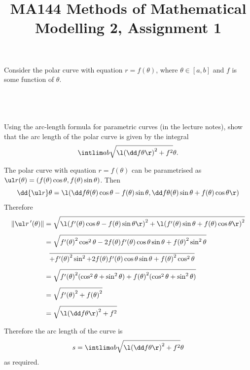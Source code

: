 \documentclass[a4paper]{article}
\title{MA144 Methods of Mathematical Modelling 2, Assignment 1}
\begin{document}
\maketitle

\setlength{\parindent}{0em}
\setlength{\parskip}{1em}


\begin{questionbody}
Consider the polar curve with equation $r = f(\theta)$, where $\theta \in [a, b]$ and $f$ is some function of $\theta$.
\end{questionbody}

\subsection{~} %

\begin{questionbody}
Using the arc-length formula for parametric curves (in the lecture notes), show that the arc length of the polar curve is given by the integral \[
\intlim a b {\sqrt{{\l( \dd f \theta \r)}^2 + f^2}} \theta .
\]
\end{questionbody}

The polar curve with equation $r = f(\theta)$ can be parametrised as $\ul r (\theta) = (f(\theta) \cos \theta, f(\theta) \sin \theta)$. Then \[
\dd{\ul r}\theta = \l(\dd f\theta (\theta) \cos \theta - f(\theta) \sin \theta, \dd f\theta (\theta) \sin \theta + f(\theta) \cos \theta\r)
\]
Therefore \begin{align*}
\| \ul r\,'(\theta) \| &= \sqrt{{\l( f'(\theta) \cos \theta - f(\theta) \sin \theta \r)}^2 + {\l( f'(\theta) \sin \theta + f(\theta) \cos \theta \r)}^2} \\[1ex]
&= \sqrt{{f'(\theta)}^2 \cos^2 \theta - 2 f(\theta) f'(\theta) \cos\theta \sin\theta + {f(\theta)}^2 \sin^2 \theta} \\[1ex]
&\phantom{=} \overline{+ {f'(\theta)}^2 \sin^2 + 2 f(\theta) f'(\theta) \cos\theta \sin\theta + {f(\theta)}^2 \cos^2 \theta} \\[1ex]
&= \sqrt{{f'(\theta)}^2 (\cos^2 \theta + \sin^2 \theta) + {f(\theta)}^2 (\cos^2 \theta + \sin^2 \theta)} \\[1ex]
&= \sqrt{{f'(\theta)}^2 + {f(\theta)}^2} \\[1ex]
&= \sqrt{{\l(\dd f\theta\r)}^2 + f^2}
\end{align*}

Therefore the arc length of the curve is \[
s = \intlim ab {\sqrt{{\l(\dd f\theta\r)}^2 + f^2}}\theta
\] as required.
\end{document}
